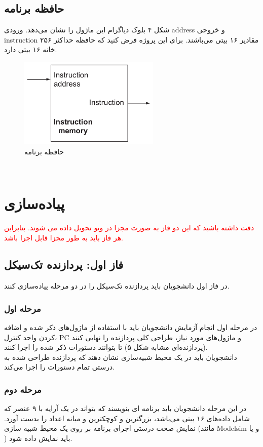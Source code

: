 \subsection{حافظه برنامه}
{شکل ۴ بلوک دیاگرام این ماژول را نشان می‌دهد. ورودی address و خروجی instruction مقادیر ۱۶ بیتی می‌باشند. برای این پروژه فرض کنید که حافظه حداکثر ۲۵۶ خانه ۱۶ بیتی دارد.}
\begin{figure}[H]
    \centering
    \includegraphics[width=0.6\textwidth]{images/MIPS_Instruction_Memory.png}
    \caption{حافظه برنامه}
    \label{Instruction_Memory}
\end{figure}\\
\section{پیاده‌سازی}
{\Large\textcolor{red}{دقت داشته باشید که این دو فاز به صورت مجزا در ویو تحویل داده می شوند. بنابراین هر فاز باید به طور مجزا قابل اجرا باشد.}\\}
\subsection{فاز اول: پردازنده تک‌سیکل }
{در فاز اول دانشجویان باید پردازنده تک‌سیکل را در دو مرحله پیاده‌سازی کنند.}
\subsubsection{مرحله اول}
{در مرحله اول انجام آزمایش دانشجویان باید با استفاده از ماژول‌های ذکر شده و اضافه کردن واحد کنترل، PC و ماژول‌های مورد نیاز، طراحی کلی پردازنده را نهایی کنند (پردازنده‌ای مشابه شکل ۵) تا بتوانند دستورات ذکر شده را اجرا کنند.}\\
{دانشجویان باید در یک محیط شبیه‌سازی نشان دهند که پردازنده طراحی شده به درستی تمام دستورات را اجرا می‌کند.}\\
\subsubsection{مرحله دوم}
{در این مرحله دانشجویان باید برنامه ای بنویسند که بتواند در یک آرایه با ۹ عنصر که شامل داده‌های ۱۶ بیتی می‌باشد، بزرگترین و کوچکترین و میانه اعداد را بدست آورد. نمایش صحت درستی اجرای برنامه بر روی یک محیط شبیه سازی (مانند Modelsim و یا ) باید نمایش داده شود.}\\

